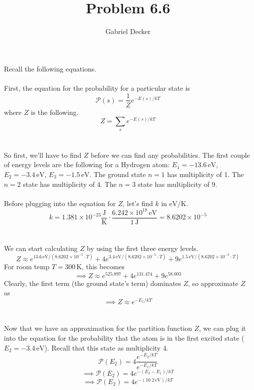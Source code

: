 \documentclass[12pt]{article}
\title{Problem 6.6}
\author{Gabriel Decker}
\newcommand{\boltzmannConstK}{1.381\times10^{-23}\frac{\text{J}}{\text{K}}}
\begin{document}
\maketitle
\begin{flushleft}



Recall the following equations.\\~\\

First, the equation for the probability for a particular state is
\begin{equation}
    \mathcal{P}(s)=\frac{1}{Z}e^{-E(s)/kT}
\end{equation}
where $Z$ is the following.
\begin{equation}
    Z=\sum_se^{-E(s)/kT}
\end{equation}\\~\\

So first, we'll have to find $Z$ before we can find any probabilities.
The first couple of energy levels are the following for a Hydrogen atom:
$E_1=-13.6\,\text{eV}$, $E_2=-3.4\,\text{eV}$, $E_3=-1.5\,\text{eV}$.
The ground state $n=1$ has multiplicity of 1. The $n=2$ state has multiplicity of 4. The $n=3$ state has multiplicity of 9.\\~\\

Before plugging into the equation for $Z$, let's find $k$ in $\text{eV/K}$.
$$k=\boltzmannConstK\cdot\frac{6.242\times10^{18}\,\text{eV}}{1\,\text{J}}=8.6202\times10^{-5}$$\\~\\

We can start calculating $Z$ by using the first three energy levels.
$$Z\approx e^{13.6\,\text{eV}/(8.6202\times10^{-5}\cdot T)} + 4e^{3.4\,\text{eV}/(8.6202\times10^{-5}\cdot T)} + 9e^{1.5\,\text{eV}/(8.6202\times10^{-5}\cdot T)}$$
For room temp $T=300\,\text{K}$, this becomes
$$\implies Z\approx e^{525.897}+4e^{131.474}+9e^{58.003}$$
Clearly, the first term (the ground state's term) dominates $Z$, so approximate $Z$ as
$$\implies Z\approx e^{-E_1/kT}$$\\~\\

Now that we have an approximation for the partition function $Z$, we can plug it into the equation for the probability that the atom is in the first excited state ($E_2=-3.4\,\text{eV}$). Recall that this state as multiplicity 4.
$$\mathcal{P}(E_2)=4\frac{e^{-E_2/kT}}{e^{-E_1/kT}}$$
$$\implies\mathcal{P}(E_2)=4e^{-(E_2-E_1)/kT}$$
$$\implies\mathcal{P}(E_2)=4e^{-(10.2\,\text{eV})/kT}$$\\~\\


\end{flushleft}
\end{document}
